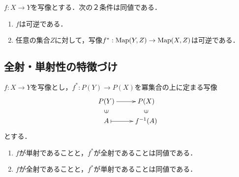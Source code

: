 \documentclass[uplatex,dvipdfmx]{jsreport}
\begin{document}
\begin{proposition}
    $f:X\to Y$を写像とする．次の２条件は同値である．
    \begin{enumerate}
        \item $f$は可逆である．
        \item 任意の集合$Z$に対して，写像$f^*:\mathrm{Map}(Y,Z)\to\mathrm{Map}(X,Z)$は可逆である．
    \end{enumerate}
\end{proposition}

\subsection{全射・単射性の特徴づけ}

\begin{proposition}[双対命題]\label{prop-dual-maps}
    $f:X\to Y$を写像とし，$f^*:P(Y)\to P(X)$を冪集合の上に定まる写像
    \[\xymatrix@R-2pc{
        P(Y)\ar[r]&P(X)\\
        \rotatebox[origin=c]{90}{$\in$}&\rotatebox[origin=c]{90}{$\in$}\\
        A\ar@{|->}[r]&f^{-1}(A)
    }\]とする．
    \begin{enumerate}
        \item $f$が単射であることと，$f^*$が全射であることは同値である．
        \item $f$が全射であることと，$f^*$が単射であることは同値である．
    \end{enumerate}
\end{proposition}
\end{document}
